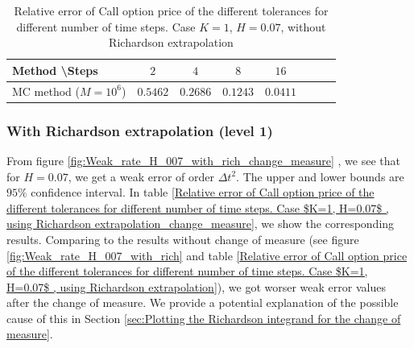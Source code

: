 \documentclass[11pt]{article}
\begin{document}
 
 
 \begin{table}[h!]
 	\centering
 	\begin{tabular}{l*{6}{c}r}
 		Method \textbackslash  Steps            & $2$ & $4$ & $8$ & $16$ &   \\
 		\hline
 		
 		MC method ($M=10^{6}$)   & $\mathbf{0.5462}$  & $\mathbf{0.2686}$  & $\mathbf{0.1243}$ & $\mathbf{0.0411}$  \\	
 		\hline
 	\end{tabular}
 	\caption{Relative error of Call option price of the different tolerances for different number of time steps. Case $K=1$, $H=0.07$, without Richardson extrapolation}
 	\label{Relative error of Call option price of the different tolerances for different number of time steps. Case $K=1, H=0.07$_change_measure}
 \end{table}
 
 
\FloatBarrier

 \subsubsection*{With Richardson extrapolation (level 1)}
 From figure \ref{fig:Weak_rate_H_007_with_rich_change_measure} , we see that  for $H=0.07$, we get a weak error of order $\Delta t^2$. The upper and lower bounds are $95\%$ confidence interval. In table \ref{Relative error of Call option price of the different tolerances for different number of time steps. Case $K=1, H=0.07$ , using Richardson extrapolation_change_measure}, we show the corresponding results. Comparing to the results without change of measure (see figure \ref{fig:Weak_rate_H_007_with_rich} and table \ref{Relative error of Call option price of the different tolerances for different number of time steps. Case $K=1, H=0.07$ , using Richardson extrapolation}),  we got worser weak error values after the change of measure. We provide a potential explanation of the possible cause of this in Section \ref{sec:Plotting the Richardson integrand for the change of measure}.
 
\end{document}
